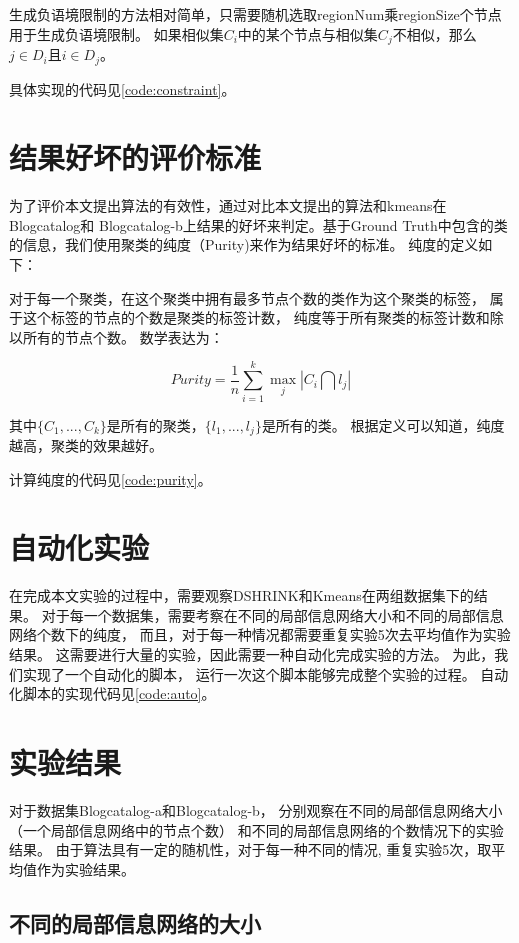 生成负语境限制的方法相对简单，只需要随机选取regionNum乘regionSize个节点用于生成负语境限制。
如果相似集$C_i$中的某个节点与相似集$C_j$不相似，那么$j \in D_i$且$i \in D_j$。

具体实现的代码见\ref{code:constraint}。

\section{结果好坏的评价标准}

为了评价本文提出算法的有效性，通过对比本文提出的算法和kmeans在Blogcatalog和
Blogcatalog-b上结果的好坏来判定。基于Ground Truth中包含的类的信息，我们使用聚类的纯度（Purity)来作为结果好坏的标准。
纯度的定义如下：

对于每一个聚类，在这个聚类中拥有最多节点个数的类作为这个聚类的标签，
属于这个标签的节点的个数是聚类的标签计数，
纯度等于所有聚类的标签计数和除以所有的节点个数。
数学表达为：

$$
Purity = \frac{1}{n} \sum_{i=1}^k \operatorname{max}_j |C_i \bigcap l_j|
$$

其中$\{C_1, ..., C_k\}$是所有的聚类，$\{l_1, ..., l_j\}$是所有的类。
根据定义可以知道，纯度越高，聚类的效果越好。

计算纯度的代码见\ref{code:purity}。


\section{自动化实验}

在完成本文实验的过程中，需要观察DSHRINK和Kmeans在两组数据集下的结果。
对于每一个数据集，需要考察在不同的局部信息网络大小和不同的局部信息网络个数下的纯度，
而且，对于每一种情况都需要重复实验5次去平均值作为实验结果。
这需要进行大量的实验，因此需要一种自动化完成实验的方法。
为此，我们实现了一个自动化的脚本，
运行一次这个脚本能够完成整个实验的过程。
自动化脚本的实现代码见\ref{code:auto}。

\section{实验结果}
\label{sec:results}
对于数据集Blogcatalog-a和Blogcatalog-b，
分别观察在不同的局部信息网络大小（一个局部信息网络中的节点个数）
和不同的局部信息网络的个数情况下的实验结果。
由于算法具有一定的随机性，对于每一种不同的情况,
重复实验5次，取平均值作为实验结果。

\subsection{不同的局部信息网络的大小}
\label{sec:results_node_max}

